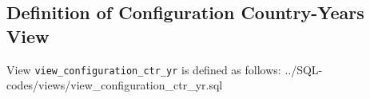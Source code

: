 \subsection{Definition of Configuration Country-Years View}\label{subsec_appx_view_configuration_ctr_yr}

View \texttt{view\_configuration\_ctr\_yr} is defined as follows:
%
{../SQL-codes/views/view_configuration_ctr_yr.sql}